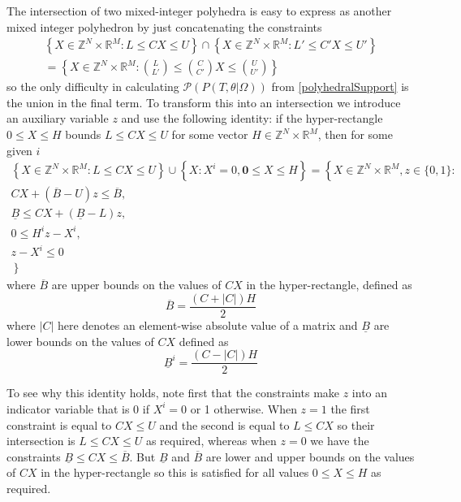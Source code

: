 \documentclass{article}
\begin{document}
The intersection of two mixed-integer polyhedra is easy to express as another mixed integer polyhedron by just concatenating the constraints
\begin{multline}
\left\{ X\in\mathbb{Z}^N \times \mathbb{R}^M : L \le  CX \le U \right\}
\cap
\left\{ X\in\mathbb{Z}^{N} \times \mathbb{R}^{M} : L' \le  C'X \le U' \right\}\\
= \left\{ X\in\mathbb{Z}^{N} \times \mathbb{R}^{M} : {L \choose L'}  \le   {C \choose C'}X \le {U \choose U'} \right\}
\label{intersection}
\end{multline}
so the only difficulty in calculating $\mathcal{P}(P(T,\theta|\Omega))$ from \eqref{polyhedralSupport} is the union in the final term. To transform this into an intersection we introduce an auxiliary variable $z$ and use the following identity: if the hyper-rectangle $0 \le X \le H$ bounds $L \le C X \le U$ for some vector $H \in \mathbb{Z}^N \times \mathbb{R}^M$, then for some given $i$ 
\begin{multline}
\left\{ X\in\mathbb{Z}^N \times \mathbb{R}^M : L \le C X \le U \right\}
\cup
\left\{X: X^i = 0, \mathbf{0} \le X \le H\right\}
= \left\{ \right.X\in\mathbb{Z}^N \times \mathbb{R}^M, z\in\{0,1\}:\\
CX + (\overline{B}-U)z \le \overline{B},\\
\underline{B} \le CX + (\underline{B}-L)z,\\
0 \le H^iz - X^i,\\
 z - X^i \le 0\\
\left. \right\}
\label{implication}
\end{multline}
where $\overline{B}$ are upper bounds on the values of $CX$ in the hyper-rectangle, defined as
\[
\overline{B} = \frac{\left(C+\left|C\right|\right)H}{2}
\]
where $|C|$ here denotes an element-wise absolute value of a matrix and $\underline{B}$ are lower bounds on the values of $CX$ defined as
\[
\underline{B}^i = \frac{\left(C - \left|C\right|\right)H}{2}
\]

To see why this identity holds, note first that the constraints make $z$ into an indicator variable that is 0 if $X^i=0$ or 1 otherwise. When $z=1$ the first constraint is equal to $CX \le U$ and the second is equal to $L \le CX$ so their intersection is $L \le  CX \le U$ as required, whereas when $z=0$ we have the constraints $\underline{B} \le CX \le \overline{B}$. But $\underline{B}$ and $\overline{B}$ are lower and upper bounds on the values of $CX$ in the hyper-rectangle so this is satisfied for all values $0 \le X \le H$ as required. 
\end{document}
